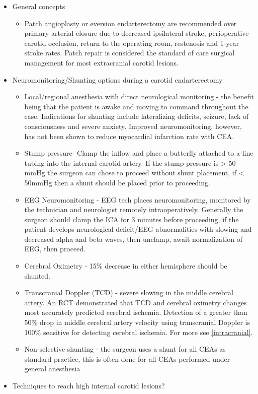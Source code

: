\documentclass[
]{book}
\providecommand{\tightlist}{%
  \setlength{\itemsep}{0pt}\setlength{\parskip}{0pt}}
\begin{document}
\begin{itemize}
\item
  General concepts

  \begin{itemize}
  \tightlist
  \item
    Patch angioplasty or eversion endarterectomy are recommended
    over primary arterial closure due to decreased ipsilateral
    stroke, perioperative carotid occlusion, return to the operating
    room, restenosis and 1-year stroke rates.\citep{goodney2010, rerkasem2009} Patch repair is considered the standard of care
    surgical management for most extracranial carotid
    lesions.\citep{arnold2019}
  \end{itemize}
\item
  Neuromonitoring/Shunting options during a carotid
  endarterectomy\citep{chongruksut2014, wiske2018}

  \begin{itemize}
  \item
    Local/regional anesthesia with direct neurological monitoring -
    the benefit being that the patient is awake and moving to
    command throughout the case. Indications for shunting include
    lateralizing deficits, seizure, lack of consciousness and severe
    anxiety. Improved neuromonitoring, however, has not been shown
    to reduce myocardial infarction rate with CEA.
  \item
    Stump pressure- Clamp the inflow and place a butterfly attached
    to a-line tubing into the internal carotid artery. If the stump
    pressure is \textgreater{} 50 mmHg the surgeon can chose to proceed without
    shunt placement, if \textless{} 50mmHg then a shunt should be placed
    prior to proceeding.
  \item
    EEG Neuromonitoring - EEG tech places neuromonitoring, monitored
    by the technician and neurologist remotely intraoperatively.
    Generally the surgeon should clamp the ICA for 3 minutes before
    proceeding, if the patient develops neurological deficit/EEG
    abnormalities with slowing and decreased alpha and beta waves,
    then unclamp, await normalization of EEG, then proceed.
  \item
    Cerebral Oximetry - 15\% decrease in either hemisphere should be
    shunted.
  \item
    Transcranial Doppler (TCD) - severe slowing in the middle
    cerebral artery. An RCT demonstrated that TCD and cerebral
    oximetry changes most accurately predicted cerebral ischemia.
    Detection of a greater than 50\% drop in middle cerebral artery
    velocity using transcranial Doppler is 100\% sensitive for
    detecting cerebral ischemia. \citep{moritz2007} For more see
    \ref{intracranial}.
  \item
    Non-selective shunting - the surgeon uses a shunt for all CEAs
    as standard practice, this is often done for all CEAs performed
    under general anesthesia
  \end{itemize}
\item
  Techniques to reach high internal carotid lesions?\citep{beretta2006}


\end{itemize}
\end{document}
